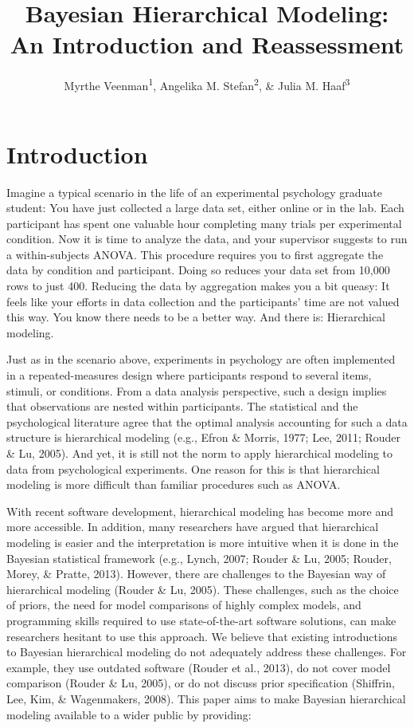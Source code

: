 \documentclass[
  english,
  doc,floatsintext]{apa6}
\title{Bayesian Hierarchical Modeling: An Introduction and Reassessment}
\author{Myrthe Veenman\textsuperscript{1}, Angelika M. Stefan\textsuperscript{2}, \& Julia M. Haaf\textsuperscript{3}}
\date{}
\affiliation{\vspace{0.5cm}\textsuperscript{1} Leiden University\\\textsuperscript{2} Universität der Bundeswehr München\\\textsuperscript{3} University of Amsterdam}
\begin{document}
\maketitle

\newpage

\hypertarget{introduction}{%
\section{Introduction}\label{introduction}}

Imagine a typical scenario in the life of an experimental psychology graduate student: You have just collected a large data set, either online or in the lab. Each participant has spent one valuable hour completing many trials per experimental condition. Now it is time to analyze the data, and your supervisor suggests to run a within-subjects ANOVA. This procedure requires you to first aggregate the data by condition and participant. Doing so reduces your data set from 10,000 rows to just 400. Reducing the data by aggregation makes you a bit queasy: It feels like your efforts in data collection and the participants' time are not valued this way. You know there needs to be a better way. And there is: Hierarchical modeling.

Just as in the scenario above, experiments in psychology are often implemented in a repeated-measures design where participants respond to several items, stimuli, or conditions. From a data analysis perspective, such a design implies that observations are nested within participants. The statistical and the psychological literature agree that the optimal analysis accounting for such a data structure is hierarchical modeling (e.g., Efron \& Morris, 1977; Lee, 2011; Rouder \& Lu, 2005). And yet, it is still not the norm to apply hierarchical modeling to data from psychological experiments. One reason for this is that hierarchical modeling is more difficult than familiar procedures such as ANOVA.

With recent software development, hierarchical modeling has become more and more accessible. In addition, many researchers have argued that hierarchical modeling is easier and the interpretation is more intuitive when it is done in the Bayesian statistical framework (e.g., Lynch, 2007; Rouder \& Lu, 2005; Rouder, Morey, \& Pratte, 2013).
However, there are challenges to the Bayesian way of hierarchical modeling (Rouder \& Lu, 2005). These challenges, such as the choice of priors, the need for model comparisons of highly complex models, and programming skills required to use state-of-the-art software solutions, can make researchers hesitant to use this approach. We believe that existing introductions to Bayesian hierarchical modeling do not adequately address these challenges. For example, they use outdated software (Rouder et al., 2013), do not cover model comparison (Rouder \& Lu, 2005), or do not discuss prior specification (Shiffrin, Lee, Kim, \& Wagenmakers, 2008). This paper aims to make Bayesian hierarchical modeling available to a wider public by providing:
\end{document}
